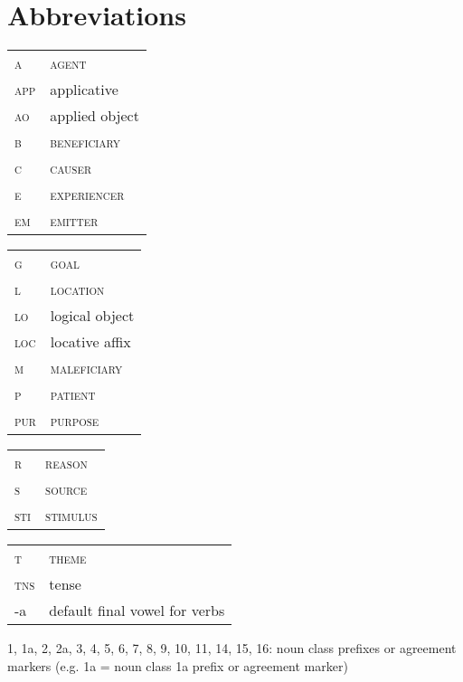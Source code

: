 \documentclass[output=paper]{langsci/langscibook}
\begin{document}
\section*{Abbreviations}

\begin{tabularx}{.45\textwidth}{lX}
\textsc{a} & \textsc{agent} \\
\textsc{app} & applicative \\
\textsc{ao} & applied object  \\
\textsc{b} & \textsc{beneficiary} \\
\textsc{c} & \textsc{causer} \\
\textsc{e} & \textsc{experiencer} \\
\textsc{em} & \textsc{emitter} \\
\end{tabularx}
\begin{tabularx}{.45\textwidth}{lX}
\textsc{g} & \textsc{goal} \\
\textsc{l} & \textsc{location} \\
\textsc{lo} & logical object  \\
\textsc{loc} & locative affix \\
\textsc{m} & \textsc{maleficiary} \\
\textsc{p} & \textsc{patient} \\
\textsc{pur} & \textsc{purpose}  \\
\end{tabularx}

\begin{tabularx}{.45\textwidth}{lX}
\textsc{r} & \textsc{reason} \\
\textsc{s} & \textsc{source} \\
\textsc{sti} & \textsc{stimulus} \\
\end{tabularx}
\begin{tabularx}{.45\textwidth}{lX}
\textsc{t} & \textsc{theme} \\
\textsc{tns} & tense  \\
-a & default final vowel for verbs \\
\end{tabularx}

1, 1a, 2, 2a, 3, 4, 5, 6, 7, 8, 9, 10, 11, 14, 15, 16: noun class prefixes or agreement markers (e.g. 1a = noun class 1a prefix or agreement marker)
\end{document}
